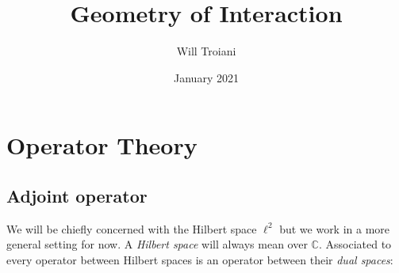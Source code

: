 \documentclass[12pt]{article}
\title{Geometry of Interaction}
\author{Will Troiani}
\date{January 2021}
\theoremstyle{plain}
\theoremstyle{definition}
\newcommand{\bb}[1]{\mathbb{#1}}
\begin{document}
\maketitle
\tableofcontents

\section{Operator Theory}
\subsection{Adjoint operator}
We will be chiefly concerned with the Hilbert space $\ell^2$ but we work in a more general setting for now. A \emph{Hilbert space} will always mean over $\bb{C}$. Associated to every operator between Hilbert spaces is an operator between their \emph{dual spaces}:
\end{document}
